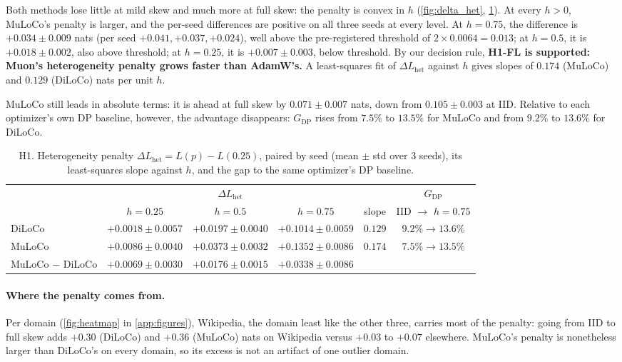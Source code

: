 \documentclass{article}
\newcommand{\Lhet}{\Delta L_{\mathrm{het}}}
\begin{document}
Both methods lose little at mild skew and much more at full skew: the penalty is convex in $h$ (\cref{fig:delta_het}, \cref{tab:h1}). At every $h>0$, MuLoCo's penalty is larger, and the per-seed differences are positive on all three seeds at every level. At $h = 0.75$, the difference is $+0.034 \pm 0.009$ nats (per seed $+0.041, +0.037, +0.024$), well above the pre-registered threshold of $2 \times 0.0064 = 0.013$; at $h = 0.5$, it is $+0.018 \pm 0.002$, also above threshold; at $h = 0.25$, it is $+0.007 \pm 0.003$, below threshold. By our decision rule, \textbf{H1-FL is supported:
Muon's heterogeneity penalty grows faster than AdamW's.} A least-squares fit of $\Lhet$ against $h$ gives slopes of $0.174$ (MuLoCo) and $0.129$ (DiLoCo) nats per unit $h$.

MuLoCo still leads in absolute terms: it is ahead at full skew by $0.071 \pm 0.007$ nats, down from $0.105 \pm 0.003$ at IID. Relative to each optimizer's own DP baseline, however, the advantage disappears: $G_{\mathrm{DP}}$ rises from $7.5\%$ to $13.5\%$ for MuLoCo and from $9.2\%$ to $13.6\%$ for DiLoCo.

\begin{table}[t]
  \centering
  \caption{H1. Heterogeneity penalty $\Lhet = L(p) - L(0.25)$, paired by seed (mean $\pm$ std over 3 seeds), its least-squares slope against $h$, and the gap to the same optimizer's DP baseline.}
  \label{tab:h1}
  \footnotesize
  \setlength{\tabcolsep}{4pt}
  \begin{tabular}{@{}lccccc@{}}
    \toprule
    & \multicolumn{3}{c}{$\Lhet$} & & $G_{\mathrm{DP}}$ \\
    \cmidrule(lr){2-4}
    & $h=0.25$ & $h=0.5$ & $h=0.75$ & slope & IID $\to$ $h=0.75$ \\
    \midrule
    DiLoCo & $+0.0018 \pm 0.0057$ & $+0.0197 \pm 0.0040$ & $+0.1014 \pm 0.0059$ & $0.129$ & $9.2\% \to 13.6\%$ \\
    MuLoCo & $+0.0086 \pm 0.0040$ & $+0.0373 \pm 0.0032$ & $+0.1352 \pm 0.0086$ & $0.174$ & $7.5\% \to 13.5\%$ \\
    \midrule
    MuLoCo $-$ DiLoCo & $+0.0069 \pm 0.0030$ & $+0.0176 \pm 0.0015$ & $+0.0338 \pm 0.0086$ & & \\
    \bottomrule
  \end{tabular}
\end{table}

\paragraph{Where the penalty comes from.} Per domain (\cref{fig:heatmap} in \cref{app:figures}), Wikipedia, the domain least like the other three, carries most of the penalty: going from IID to full skew adds $+0.30$ (DiLoCo) and $+0.36$ (MuLoCo) nats on Wikipedia versus $+0.03$ to $+0.07$ elsewhere. MuLoCo's penalty is nonetheless larger than DiLoCo's on every domain, so its excess is not an artifact of one outlier domain.
\end{document}
